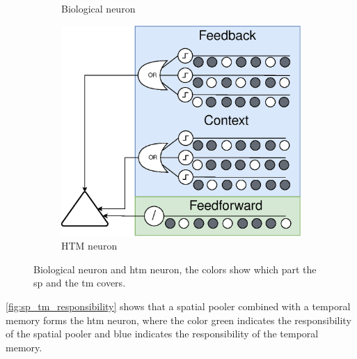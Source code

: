 \begin{figure}[htb]
\begin{subfigure}[b]{0.35\linewidth}
        \caption{Biological neuron}
    \end{subfigure}
    \hfill
    \begin{subfigure}[b]{0.55\linewidth}
        \centering
        \includegraphics[width=\linewidth]{resources/related_works/neuron_htm}
        \caption{HTM neuron}
    \end{subfigure}
    \caption[SP and TM Responsibilities]{Biological neuron and \gls*{htm} neuron, the colors show which part the \gls*{sp} and the \gls*{tm} covers.}
    \label{fig:sp_tm_responsibility}
\end{figure}
\par
\autoref{fig:sp_tm_responsibility} shows that a spatial pooler combined with a temporal memory forms the \gls*{htm} neuron, where the color green indicates the responsibility of the spatial pooler and blue indicates the responsibility of the temporal memory.
